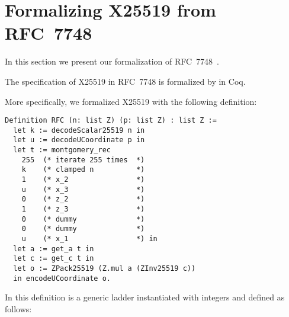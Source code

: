 \section{Formalizing X25519 from RFC~7748}
\label{sec:Coq-RFC}

In this section we present our formalization of RFC~7748~\cite{rfc7748}.

\begin{informaltheorem}
The specification of X25519 in RFC~7748 is formalized by  in Coq.
\end{informaltheorem}

More specifically, we formalized X25519 with the following definition:
\begin{lstlisting}[language=Coq]
Definition RFC (n: list Z) (p: list Z) : list Z :=
  let k := decodeScalar25519 n in
  let u := decodeUCoordinate p in
  let t := montgomery_rec
    255  (* iterate 255 times  *)
    k    (* clamped n          *)
    1    (* x_2                *)
    u    (* x_3                *)
    0    (* z_2                *)
    1    (* z_3                *)
    0    (* dummy              *)
    0    (* dummy              *)
    u    (* x_1                *) in
  let a := get_a t in
  let c := get_c t in
  let o := ZPack25519 (Z.mul a (ZInv25519 c))
  in encodeUCoordinate o.
\end{lstlisting}

In this definition  is a generic ladder instantiated
with integers and defined as follows:

